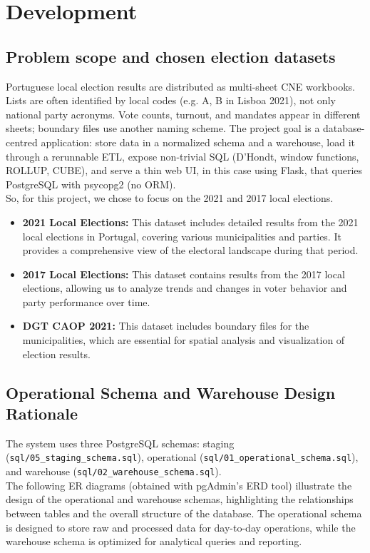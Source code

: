 \section{Development}

\subsection{Problem scope and chosen election datasets}
Portuguese local election results are distributed as 
multi-sheet CNE workbooks. Lists are often 
identified by local codes (e.g. A, B in Lisboa 2021), 
not only national party acronyms. Vote counts, turnout,
 and mandates appear in different sheets; boundary files 
 use another naming scheme. 
 The project goal is a database-centred application: store data in a normalized schema and a warehouse, 
 load it through a rerunnable ETL, expose non-trivial SQL 
 (D'Hondt, window functions, ROLLUP, CUBE), and 
 serve a thin web UI, in this case using Flask, that queries PostgreSQL with psycopg2 (no ORM).   \\
 So, for this project, we chose to focus on the 2021 and 2017 local elections. 
 \begin{itemize}
        \item \textbf{2021 Local Elections:} This dataset includes detailed results from the 2021 local elections in Portugal, covering various municipalities and parties. It provides a comprehensive view of the electoral landscape during that period.
        \item \textbf{2017 Local Elections:} This dataset contains results from the 2017 local elections, allowing us to analyze trends and changes in voter behavior and party performance over time.
        \item \textbf{DGT CAOP 2021:} This dataset includes boundary files for the municipalities, which are essential for spatial analysis and visualization of election results.
\end{itemize}
\subsection{Operational Schema and Warehouse Design Rationale}
The system uses three PostgreSQL schemas: staging 
(\texttt{sql/05_staging_schema.sql}), operational (\texttt{sql/01_operational_schema.sql}),
 and warehouse (\texttt{sql/02_warehouse_schema.sql}).  \\
The following ER diagrams (obtained with pgAdmin's ERD tool) illustrate the design of the operational and warehouse schemas, 
highlighting the relationships between tables and the overall structure of the database. The operational schema is designed to store raw and processed data for day-to-day operations, while the warehouse schema is optimized for analytical queries and reporting.

